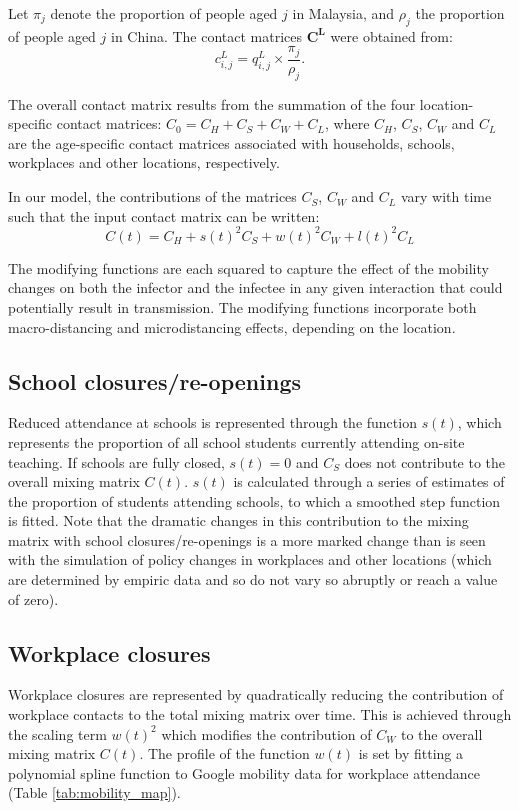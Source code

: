 Let $\pi_j$ denote the proportion of people aged $j$ in Malaysia, and $\rho_j$ the proportion of people aged $j$ in China. The contact matrices $\mathbf{C^L}$ were obtained from:
$$
c_{i,j}^L = q_{i,j}^L \times \frac{\pi_j}{\rho_j} . 
$$


The overall contact matrix results from the summation of the four location-specific contact matrices: \(C_{0}=C_{H}+C_{S}+C_{W}+C_{L}\), where \(C_{H}\), \(C_{S}\), \(C_{W}\) and \(C_{L}\) are the age-specific contact matrices associated with households, schools, workplaces and other locations, respectively.

In our model, the contributions of the matrices \(C_{S}\), \(C_{W}\) and \(C_{L}\) vary with time such that the input contact matrix can be written:
\[C(t)= C_{H}+ s(t)^{2}C_{S}+ w(t)^{2}C_{W}+l(t)^{2}C_{L}\]

The modifying functions are each squared to capture the effect of the mobility changes on both the infector and the infectee in any given interaction that could potentially result in transmission. The modifying functions incorporate both macro-distancing and microdistancing effects, depending on the location.

\subsection{School closures/re-openings}
Reduced attendance at schools is represented through the function \(s(t)\), which represents the proportion of all school students currently attending on-site teaching. If schools are fully closed, \(s(t)=0\) and \(C_{S}\) does not contribute to the overall mixing matrix \(C(t)\). \(s(t)\) is calculated through a series of estimates of the proportion of students attending schools, to which a smoothed step function is fitted. Note that the dramatic changes in this contribution to the mixing matrix with school closures/re-openings is a more marked change than is seen with the simulation of policy changes in workplaces and other locations (which are determined by empiric data and so do not vary so abruptly or reach a value of zero).

\subsection{Workplace closures}
Workplace closures are represented by quadratically reducing the contribution of workplace contacts to the total mixing matrix over time. This is achieved through the scaling term \(w(t)^{2}\) which modifies the contribution of \(C_{W}\) to the overall mixing matrix \(C(t)\). The profile of the function \(w(t)\) is set by fitting a polynomial spline function to Google mobility data for workplace attendance (Table \ref{tab:mobility_map}).

